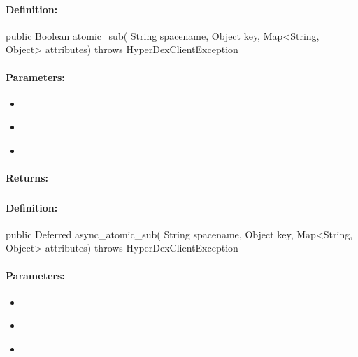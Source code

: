 \paragraph{Definition:}
\begin{javacode}
public Boolean atomic_sub(
        String spacename,
        Object key,
        Map<String, Object> attributes) throws HyperDexClientException
\end{javacode}

\paragraph{Parameters:}
\begin{itemize}[noitemsep]
\item {}\\

\item {}\\

\item {}\\

\end{itemize}

\paragraph{Returns:}


\pagebreak
\subsubsection{}
\label{api:java:async_atomic_sub}


\paragraph{Definition:}
\begin{javacode}
public Deferred async_atomic_sub(
        String spacename,
        Object key,
        Map<String, Object> attributes) throws HyperDexClientException
\end{javacode}

\paragraph{Parameters:}
\begin{itemize}[noitemsep]
\item {}\\

\item {}\\

\item {}\\

\end{itemize}

